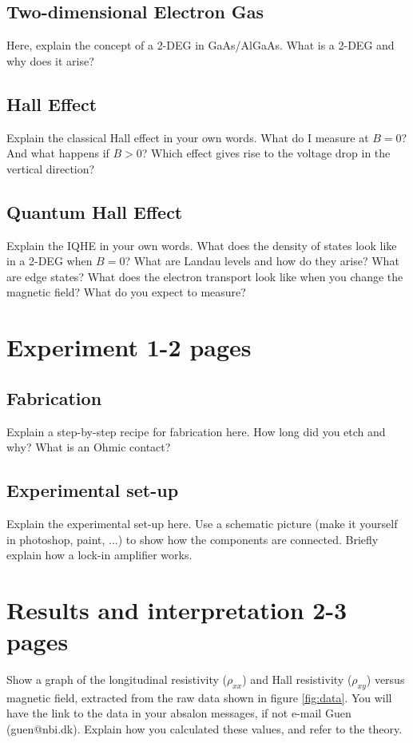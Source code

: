 \documentclass[a4paper]{article}
\begin{document}
\subsection{Two-dimensional Electron Gas}
Here, explain the concept of a 2-DEG in GaAs/AlGaAs. What is a 2-DEG and why does it arise?

\subsection{Hall Effect}
Explain the classical Hall effect in your own words. What do I measure at $B=0$? And what happens if $B>0$? Which effect gives rise to the voltage drop in the vertical direction?

\subsection{Quantum Hall Effect}
Explain the IQHE in your own words. What does the density of states look like in a 2-DEG when $B=0$? What are Landau levels and how do they arise? What are edge states? What does the electron transport look like when you change the magnetic field? What do you expect to measure?

\section{Experiment 1-2 pages}
\subsection{Fabrication}
Explain a step-by-step recipe for fabrication here. How long did you etch and why? What is an Ohmic contact?
\subsection{Experimental set-up}
Explain the experimental set-up here. Use a schematic picture (make it yourself in photoshop, paint, ...) to show how the components are connected. Briefly explain how a lock-in amplifier works.

\section{Results and interpretation 2-3 pages}
Show a graph of the longitudinal resistivity ($\rho_{xx}$) and Hall resistivity ($\rho_{xy}$) versus magnetic field, extracted from the raw data shown in figure \ref{fig:data}. You will have the link to the data in your absalon messages, if not e-mail Guen (guen@nbi.dk). Explain how you calculated these values, and refer to the theory.
\end{document}
